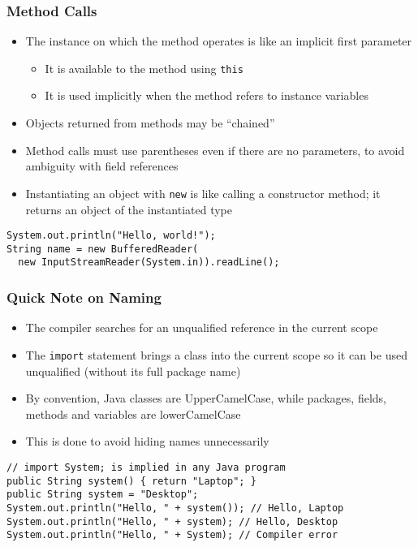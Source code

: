 \documentclass{beamer}
\begin{document}
\begin{frame}[fragile]
\frametitle{Method Calls}
\begin{itemize}
\item The instance on which the method operates is like an implicit first parameter
\begin{itemize}
\item It is available to the method using \texttt{this}
\item It is used implicitly when the method refers to instance variables
\end{itemize}
\item Objects returned from methods may be ``chained''
\item Method calls must use parentheses even if there are no parameters, to avoid ambiguity with field references
\item Instantiating an object with \texttt{new} is like calling a constructor method; it returns an object of the instantiated type
\end{itemize}
\lstset{language=Java}
\begin{lstlisting}
System.out.println("Hello, world!");
String name = new BufferedReader(
  new InputStreamReader(System.in)).readLine();
\end{lstlisting}
\end{frame}

\begin{frame}[fragile]
\frametitle{Quick Note on Naming}
\begin{itemize}
\item The compiler searches for an unqualified reference in the current scope
\item The \texttt{import} statement brings a class into the current scope so it can be used unqualified (without its full package name)
\item By convention, Java classes are UpperCamelCase, while packages, fields, methods and variables are lowerCamelCase
\item This is done to avoid hiding names unnecessarily
\end{itemize}
\lstset{language=Java}
\begin{lstlisting}
// import System; is implied in any Java program
public String system() { return "Laptop"; }
public String system = "Desktop";
System.out.println("Hello, " + system()); // Hello, Laptop
System.out.println("Hello, " + system); // Hello, Desktop
System.out.println("Hello, " + System); // Compiler error
\end{lstlisting}
\end{frame}
\end{document}
